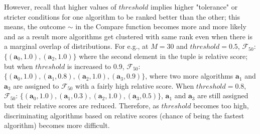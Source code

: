 \documentclass[conference]{IEEEtran}
\begin{document}
 However, recall that higher values of $threshold$ implies higher "tolerance" or stricter conditions for one algorithm to be ranked better than the other; this means, the outcome $\sim$ in the Compare function becomes more and more likely and as a result more algorithms get clustered with same rank even when there is a marginal overlap of distributions. For e.g., at $M=30$ and $threshold=0.5$,  $\mathcal{F}_{50}$: $\{(\mathbf{a}_0,1.0),(\mathbf{a}_2,1.0)\}$ where the second element in the tuple is relative score; but when $threshold$ is increased to 0.9, $\mathcal{F}_{50}$: $\{(\mathbf{a}_0,1.0),(\mathbf{a}_1,0.8), (\mathbf{a}_2,1.0), (\mathbf{a}_3,0.9)\}$, where two more  algorithms $\mathbf{a}_1$ and $\mathbf{a}_3$ are assigned to $\mathcal{F}_{50}$ with a fairly high relative score. When $threshold = 0.8$, $\mathcal{F}_{50}$: $\{(\mathbf{a}_0,1.0),(\mathbf{a}_1,0.3), (\mathbf{a}_2,1.0), (\mathbf{a}_3,0.5)\}$, $\mathbf{a}_1$ and $\mathbf{a}_3$ are still assigned but their relative scores are reduced. Therefore, as $threshold$ becomes too high, discriminating algorithms based on relative scores (chance of being the fastest algorithm) becomes more difficult.
 
\end{document}
